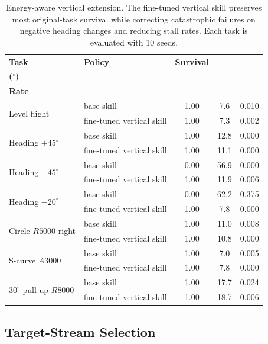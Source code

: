 \documentclass{article}
\begin{document}
\begin{table}[t]
  \caption{Energy-aware vertical extension. The fine-tuned vertical skill preserves most original-task survival while correcting catastrophic failures on negative heading changes and reducing stall rates. Each task is evaluated with 10 seeds.}
  \label{tab:vertical-extension}
  \centering
  \small
  \setlength{\tabcolsep}{4pt}
  \begin{tabular}{@{}llccc@{}}
    \toprule
    \textbf{Task}
    & \textbf{Policy}
    & \textbf{Survival}
    & \shortstack{\textbf{Att. Err.}\\\textbf{($^\circ$)}}
    & \shortstack{\textbf{Stall}\\\textbf{Rate}} \\
    \midrule
    \multirow{2}{*}{Level flight}
      & base skill & 1.00 & 7.6 & 0.010 \\
      & fine-tuned vertical skill & 1.00 & 7.3 & 0.002 \\
    \midrule
    \multirow{2}{*}{Heading $+45^\circ$}
      & base skill & 1.00 & 12.8 & 0.000 \\
      & fine-tuned vertical skill & 1.00 & 11.1 & 0.000 \\
    \midrule
    \multirow{2}{*}{Heading $-45^\circ$}
      & base skill & 0.00 & 56.9 & 0.000 \\
      & fine-tuned vertical skill & 1.00 & 11.9 & 0.006 \\
    \midrule
    \multirow{2}{*}{Heading $-20^\circ$}
      & base skill & 0.00 & 62.2 & 0.375 \\
      & fine-tuned vertical skill & 1.00 & 7.8 & 0.000 \\
    \midrule
    \multirow{2}{*}{Circle $R5000$ right}
      & base skill & 1.00 & 11.0 & 0.008 \\
      & fine-tuned vertical skill & 1.00 & 10.8 & 0.000 \\
    \midrule
    \multirow{2}{*}{S-curve $A3000$}
      & base skill & 1.00 & 7.0 & 0.005 \\
      & fine-tuned vertical skill & 1.00 & 7.8 & 0.000 \\
    \midrule
    \multirow{2}{*}{$30^\circ$ pull-up $R8000$}
      & base skill & 1.00 & 17.7 & 0.024 \\
      & fine-tuned vertical skill & 1.00 & 18.7 & 0.006 \\
    \bottomrule
  \end{tabular}
\end{table}


\subsection{Target-Stream Selection}
\end{document}
